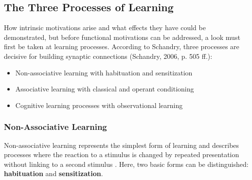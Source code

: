 \subsection*{The Three Processes of Learning}

How intrinsic motivations arise and what effects they have could be demonstrated, but before functional motivations can be addressed, a look must first be taken at learning processes.
According to Schandry, three processes are decisive for building synaptic connections (Schandry, 2006, p. 505 ff.):

\begin{itemize}
    \item Non-associative learning with habituation and sensitization
    \item Associative learning with classical and operant conditioning
    \item Cognitive learning processes with observational learning
\end{itemize}

\subsubsection*{Non-Associative Learning}

Non-associative learning represents the simplest form of learning and describes processes where the reaction to a stimulus is changed by repeated presentation without linking to a second stimulus \cite{Schandry2006}.
Here, two basic forms can be distinguished: \textbf{habituation} and \textbf{sensitization}.

